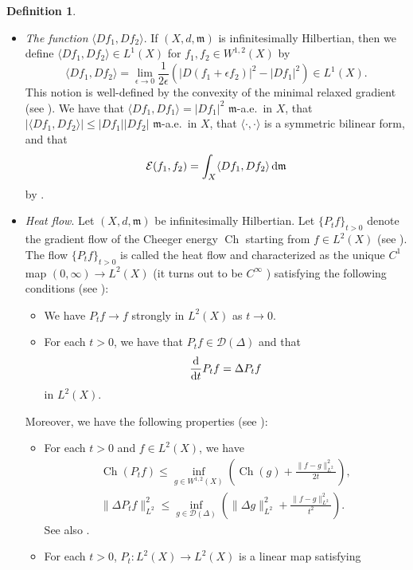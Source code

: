 \documentclass[10pt,a4paper]{amsart}
\numberwithin{equation}{section}
\theoremstyle{definition}
\newtheorem{Def}[Thm]{Definition}
\newcommand{\Ch}{\operatorname{Ch}}
\newcommand{\mf}{\mathfrak{m}}
\newcommand{\D}{\mathcal{D}}
\begin{document}
\begin{Def}
\begin{itemize}
\[\begin{array}{@{}l@{}}
\text{$\mathcal{E}(f,g)=-\int_X g \Delta f \,{\rm d}\mf$ for any $g\in W^{1,2}(X)$}\end{array}  \right\} .
\]
For each $f\in \D(\Delta)$, $\Delta f\in L^2(X)$ is uniquely determined.
\item \emph{The function} $\langle D f_1,D f_2\rangle$. If $(X,d,\mf)$ is infinitesimally Hilbertian, then we define \linebreak $\langle D f_1,D f_2\rangle\in L^1(X)$ for $f_1,f_2\in W^{1,2}(X)$ by
\[
\langle D f_1,D f_2\rangle=\lim_{\epsilon\to 0}\frac{1}{2\epsilon}(|D (f_1+\epsilon f_2)|^2-|D f_1|^2)\in L^1(X).
\]
This notion is well-defined by the convexity of the minimal relaxed gradient (see \cite[Definition~4.12]{AGS2}).
We have that $\langle D f_1,D f_1\rangle=|D f_1|^2$ $\mf$-a.e.\ in $X$, that $|\langle D f_1, D f_2\rangle|\leq |D f_1| |D f_2 |$ $\mf$-a.e.\ in $X$, that $\langle\cdot,\cdot\rangle$ is a symmetric bilinear form, and that
\[
\mathcal{E}(f_1,f_2)=\int_X \langle D f_1,D f_2\rangle\,{\rm d}\mf
\]
by \cite[Propositions 4.13 and 4.14, Theorem~4.18]{AGS2}.
\item \emph{Heat flow}. Let $(X,d,\mf)$ be infinitesimally Hilbertian.
Let $\{P_t f\}_{t>0}$ denote the gradient flow of the Cheeger energy $\Ch$ starting from $f\in L^2(X)$ (see \cite[Definition~5.2.5]{GP}).
The flow $\{P_t f\}_{t>0}$ is called the heat flow and characterized as the unique $C^1$ map $(0,\infty)\to L^2(X)$ (it turns out to be $C^\infty$ \cite[Proposition~5.2.12]{GP}) satisfying the following conditions (see \cite[Theorem~5.1.12]{GP}):
\begin{itemize}\itemsep=0pt
\item We have $P_t f\to f$ strongly in $L^2(X)$ as $t\to 0$.
\item For each $t>0$, we have that $P_t f\in \D(\Delta)$ and that
\[
\frac{\rm d}{{\rm d} t}P_t f =\Delta P_t f
\]
in $L^2(X)$.
\end{itemize}
Moreover, we have the following properties (see \cite[Section 5.2.2]{GP}):
\begin{itemize}\itemsep=0pt
\item For each $t>0$ and $f\in L^2(X)$, we have
\begin{gather*}
\Ch(P_t f)\leq \inf_{g\in W^{1,2}(X)}\left(\Ch(g)+\frac{\|f-g\|_{L^2}^2}{2t}\right),
\\
\|\Delta P_t f\|_{L^2}^2\leq \inf_{g\in \D(\Delta)}
\left(\|\Delta g\|_{L^2}^2+\frac{\|f-g\|_{L^2}^2}{t^2}\right).
\end{gather*}
See also \cite[Theorem~5.1.12]{GP}.
\item For each $t>0$, $P_t\colon L^2(X)\to L^2(X)$ is a linear map satisfying

\end{itemize}
\end{itemize}
\end{Def}
\end{document}
